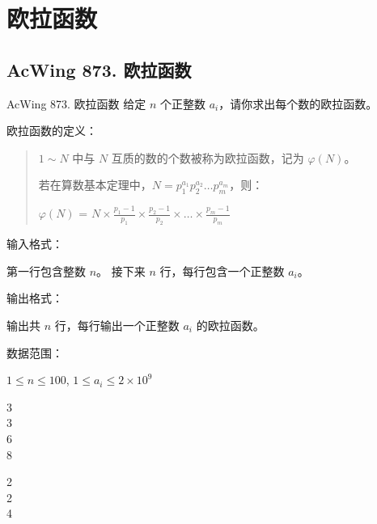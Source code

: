 \section{欧拉函数}

\subsection{AcWing 873. 欧拉函数}
\begin{titledbox}{AcWing 873. 欧拉函数}
    给定 $n$ 个正整数 $a_i$，请你求出每个数的欧拉函数。

    欧拉函数的定义：

    \begin{quote}
        $1 \sim N$ 中与 $N$ 互质的数的个数被称为欧拉函数，记为 $\varphi(N)$。

        若在算数基本定理中，$N = p_1^{a_1}p_2^{a_2}\dots p_m^{a_m}$，则：

        $\varphi (N)$ = $N \times \frac{p_1-1}{p_1} \times \frac{p_2-1}{p_2} \times \dots \times \frac{p_m-1}{p_m}$
    \end{quote}

    输入格式：

    第一行包含整数 $n$。 接下来 $n$ 行，每行包含一个正整数 $a_i$。

    输出格式：

    输出共 $n$ 行，每行输出一个正整数 $a_i$ 的欧拉函数。

    数据范围：

    $1 \le n \le 100$, $1 \le a_i \le 2 \times 10^9$

    \begin{inputblock}
        3 \\
        3 \\
        6 \\
        8
    \end{inputblock}
    \begin{outputblock}
        2 \\
        2 \\
        4
    \end{outputblock}
\end{titledbox}

